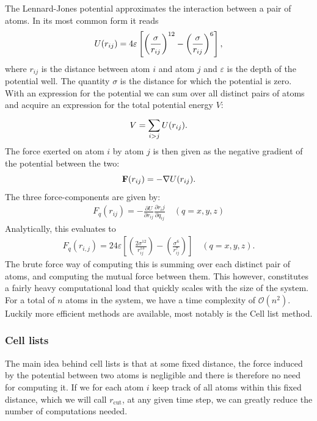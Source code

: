 \documentclass[a4paper]{article}
\renewcommand{\vec}[1]{\mathbf{#1}}
\begin{document}
    The Lennard-Jones potential approximates the interaction between a pair of
    atoms. In its most common form it reads
    \begin{equation}
        \notag U(r_{ij}) = 4\varepsilon \left[ \left( \frac{\sigma}{r_{ij}}
        \right)^{12} - \left( \frac{\sigma}{r_{ij}} \right)^6 \right],
    \end{equation}
    where $r_{ij}$ is the distance between atom $i$ and atom $j$ and
    $\varepsilon$ is the depth of the potential well. The quantity $\sigma$ is
    the distance for which the potential is zero.  With an expression for the
    potential we can sum over all distinct pairs of atoms and acquire an
    expression for the total potential energy $V$:
    \begin{equation}
        \notag V = \sum^{}_{i>j}U(r_{ij}).
    \end{equation}
    The force exerted on atom $i$ by atom $j$ is then given as the negative
    gradient of the potential between the two:
    \begin{equation}
        \notag \vec{F}(r_{ij}) = -\nabla U(r_{ij}).
    \end{equation}
    The three force-components are given by:
    \begin{align*}
        F_q(r_{ij}) = -\frac{\partial U}{\partial r_{ij}} \frac{\partial
        r_ij}{\partial q_{ij}} \quad (q = x, y, z)
    \end{align*}
    Analytically, this evaluates to
    \begin{align*}
        F_q(r_{i, j}) = 24\varepsilon \left[ \left(
        \frac{2\sigma^{12}}{r_{ij}^{13}}\right) - \left(
        \frac{\sigma^6}{r_{ij}^7}\right)\right] \quad (q = x, y, z).
    \end{align*}
    The brute force way of computing this is summing over each distinct pair of
    atoms, and computing the mutual force between them. This however,
    constitutes a fairly heavy computational load that quickly scales with the
    size of the system. For a total of $n$ atoms in the system, we have a time
    complexity of $\mathcal{O}(n^2)$. Luckily more efficient methods are
    available, most notably is the Cell list method. 

    \subsubsection{Cell lists}
    \label{ssub:cell_lists}
    
    The main idea behind cell lists is that at some fixed distance, the force
    induced by the potential between two atoms is negligible and there is
    therefore no need for computing it. If we for each atom $i$ keep track of
    all atoms within this fixed distance, which we will call $r_\mathrm{cut}$,
    at any given time step, we can greatly reduce the number of computations
    needed. 
\end{document}
